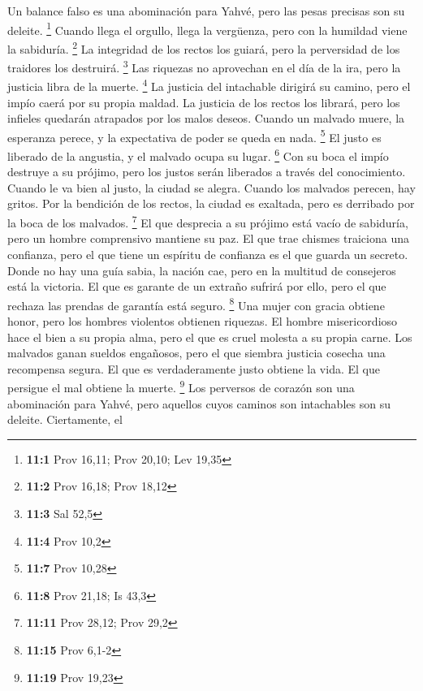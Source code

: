  Un balance falso es una abominación para Yahvé, pero las
pesas precisas son su deleite. \footnote{\textbf{11:1} Prov 16,11; Prov
  20,10; Lev 19,35}  Cuando llega el orgullo, llega la
vergüenza, pero con la humildad viene la sabiduría. \footnote{\textbf{11:2}
  Prov 16,18; Prov 18,12}  La integridad de los rectos los
guiará, pero la perversidad de los traidores los destruirá. \footnote{\textbf{11:3}
  Sal 52,5}  Las riquezas no aprovechan en el día de la
ira, pero la justicia libra de la muerte. \footnote{\textbf{11:4} Prov
  10,2}  La justicia del intachable dirigirá su camino,
pero el impío caerá por su propia maldad.  La justicia de
los rectos los librará, pero los infieles quedarán atrapados por los
malos deseos.  Cuando un malvado muere, la esperanza
perece, y la expectativa de poder se queda en nada. \footnote{\textbf{11:7}
  Prov 10,28}  El justo es liberado de la angustia, y el
malvado ocupa su lugar. \footnote{\textbf{11:8} Prov 21,18; Is 43,3}
 Con su boca el impío destruye a su prójimo, pero los
justos serán liberados a través del conocimiento.  Cuando
le va bien al justo, la ciudad se alegra. Cuando los malvados perecen,
hay gritos.  Por la bendición de los rectos, la ciudad es
exaltada, pero es derribado por la boca de los malvados. \footnote{\textbf{11:11}
  Prov 28,12; Prov 29,2}  El que desprecia a su prójimo
está vacío de sabiduría, pero un hombre comprensivo mantiene su paz.
 El que trae chismes traiciona una confianza, pero el que
tiene un espíritu de confianza es el que guarda un secreto.
 Donde no hay una guía sabia, la nación cae, pero en la
multitud de consejeros está la victoria.  El que es
garante de un extraño sufrirá por ello, pero el que rechaza las prendas
de garantía está seguro. \footnote{\textbf{11:15} Prov 6,1-2}
 Una mujer con gracia obtiene honor, pero los hombres
violentos obtienen riquezas.  El hombre misericordioso
hace el bien a su propia alma, pero el que es cruel molesta a su propia
carne.  Los malvados ganan sueldos engañosos, pero el que
siembra justicia cosecha una recompensa segura.  El que
es verdaderamente justo obtiene la vida. El que persigue el mal obtiene
la muerte. \footnote{\textbf{11:19} Prov 19,23}  Los
perversos de corazón son una abominación para Yahvé, pero aquellos cuyos
caminos son intachables son su deleite.  Ciertamente, el
